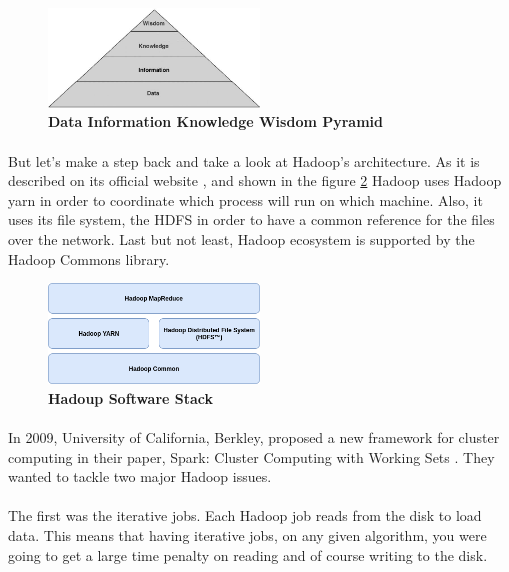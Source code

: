 \begin{figure}[h]
	\centering
	\includegraphics[width=0.5\textwidth]{images/DIKW.png}
	\caption{\bfseries Data Information Knowledge Wisdom Pyramid \cite{TheWisdomHierachy:7}}
	\label{dikw}
\end{figure}
\paragraph{} But let's make a step back and take a look at Hadoop's architecture. As it is described on its official website \cite{Hadoop:9}, and shown in the figure \ref{hadoopStack} Hadoop uses Hadoop yarn in order to coordinate which process will run on which machine. Also, it uses its file system, the HDFS in order to have a common reference for the files over the network. Last but not least, Hadoop ecosystem is supported by the Hadoop Commons library.

\begin{figure}[h]
	\centering
	\includegraphics[width=0.5\textwidth]{images/hadoop-stack.png}
	\caption{\bfseries Hadoup Software Stack}
	\label{hadoopStack}
\end{figure}

\paragraph{} In 2009, University of California, Berkley, proposed a new framework for cluster computing in their paper, Spark: Cluster Computing with Working Sets \cite{Zaharia:2010:SCC:1863103.1863113}. They wanted to tackle two major Hadoop issues. 

\paragraph{}The first was the iterative jobs. Each Hadoop job reads from the disk to load data. This means that having iterative jobs, on any given algorithm, you were going to get a large time penalty on reading and of course writing to the disk. 

